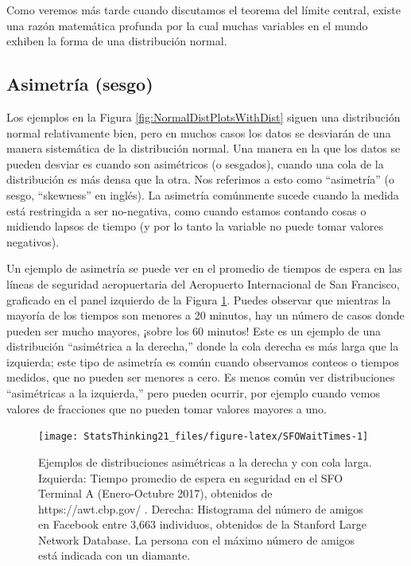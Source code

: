 \documentclass[
  12pt,
]{book}
\theoremstyle{definition}
\theoremstyle{definition}
\theoremstyle{definition}
\theoremstyle{remark}
\begin{document}
Como veremos más tarde cuando discutamos el teorema del límite central, existe una razón matemática profunda por la cual muchas variables en el mundo exhiben la forma de una distribución normal.

\hypertarget{asimetruxeda-sesgo}{%
\subsection{Asimetría (sesgo)}\label{asimetruxeda-sesgo}}

Los ejemplos en la Figura \ref{fig:NormalDistPlotsWithDist} siguen una distribución normal relativamente bien, pero en muchos casos los datos se desviarán de una manera sistemática de la distribución normal. Una manera en la que los datos se pueden desviar es cuando son asimétricos (o sesgados), cuando una cola de la distribución es más densa que la otra. Nos referimos a esto como ``asimetría'' (o sesgo, ``skewness'' en inglés). La asimetría comúnmente sucede cuando la medida está restringida a ser no-negativa, como cuando estamos contando cosas o midiendo lapsos de tiempo (y por lo tanto la variable no puede tomar valores negativos).

Un ejemplo de asimetría se puede ver en el promedio de tiempos de espera en las líneas de seguridad aeropuertaria del Aeropuerto Internacional de San Francisco, graficado en el panel izquierdo de la Figura \ref{fig:SFOWaitTimes}. Puedes observar que mientras la mayoría de los tiempos son menores a 20 minutos, hay un número de casos donde pueden ser mucho mayores, ¡sobre los 60 minutos! Este es un ejemplo de una distribución ``asimétrica a la derecha,'' donde la cola derecha es más larga que la izquierda; este tipo de asimetría es común cuando observamos conteos o tiempos medidos, que no pueden ser menores a cero. Es menos común ver distribuciones ``asimétricas a la izquierda,'' pero pueden ocurrir, por ejemplo cuando vemos valores de fracciones que no pueden tomar valores mayores a uno.

\begin{figure}
\texttt{[image: StatsThinking21\_files/figure-latex/SFOWaitTimes-1]} \caption{Ejemplos de distribuciones asimétricas a la derecha y con cola larga. Izquierda: Tiempo promedio de espera en seguridad en el SFO Terminal A (Enero-Octubre 2017), obtenidos de https://awt.cbp.gov/ . Derecha: Histograma del número de amigos en Facebook entre 3,663 individuos, obtenidos de la Stanford Large Network Database. La persona con el máximo número de amigos está indicada con un diamante.}\label{fig:SFOWaitTimes}
\end{figure}
\end{document}
